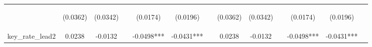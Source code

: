 \documentclass[]{article}
\begin{document}
\begin{center}
\begin{tabular}{lcccccccccccc}
\vspace{4pt} & \begin{footnotesize}(0.0362)\end{footnotesize} & \begin{footnotesize}(0.0342)\end{footnotesize} & \begin{footnotesize}\end{footnotesize} & \begin{footnotesize}(0.0174)\end{footnotesize} & \begin{footnotesize}(0.0196)\end{footnotesize} & \begin{footnotesize}\end{footnotesize} & \begin{footnotesize}(0.0362)\end{footnotesize} & \begin{footnotesize}(0.0342)\end{footnotesize} & \begin{footnotesize}\end{footnotesize} & \begin{footnotesize}(0.0174)\end{footnotesize} & \begin{footnotesize}(0.0196)\end{footnotesize} & \begin{footnotesize}\end{footnotesize} \\
key\_rate\_lead2 & 0.0238 & -0.0132 &  & -0.0498*** & -0.0431*** &  & 0.0238 & -0.0132 &  & -0.0498*** & -0.0431*** &  \\

\end{tabular}
\end{center}
\end{document}

